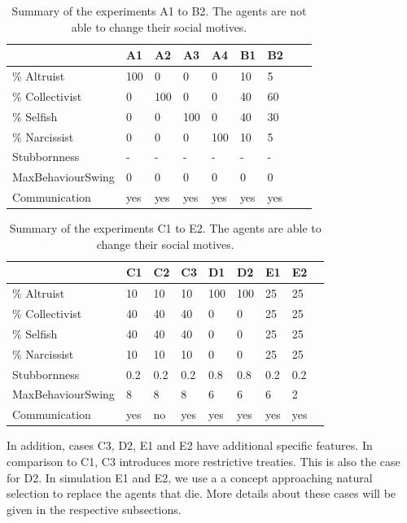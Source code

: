 \begin{table}[h]
\centering
\begin{tabular}{l|llllllll}
                  & A1  & A2 & A3 & A4 & B1  & B2  \\ \hline
\% Altruist       & 100 & 0  & 0  & 0  & 10  & 5    \\
\% Collectivist   & 0   & 100& 0  & 0  & 40  & 60   \\
\% Selfish        & 0   & 0  & 100& 0  & 40  & 30   \\
\% Narcissist     & 0   & 0  & 0  & 100& 10  & 5    \\
Stubbornness      & -   & -  & -  & -  &  -  & -    \\
MaxBehaviourSwing & 0   & 0  & 0  & 0  &  0  & 0    \\
Communication     &yes  & yes&yes &yes & yes & yes
\end{tabular}
\caption{Summary of the experiments A1 to B2. The agents are not able to change their social motives.}
\label{tab:simulation_summary_1}
\end{table}

\begin{table}[h]
\centering
\begin{tabular}{l|llllllll}
                  & C1 & C2 & C3 & D1  & D2 & E1 & E2 \\ \hline
\% Altruist       & 10 & 10 & 10 & 100 & 100& 25  & 25 \\
\% Collectivist   & 40 & 40 & 40 & 0   & 0  & 25  & 25 \\
\% Selfish        & 40 & 40 & 40 & 0   & 0  & 25  & 25 \\
\% Narcissist     & 10 & 10 & 10 & 0   & 0  & 25  & 25 \\
Stubbornness      & 0.2& 0.2& 0.2& 0.8 & 0.8& 0.2 & 0.2\\
MaxBehaviourSwing & 8  & 8  & 8  & 6   & 6  & 6   & 2 \\
Communication     & yes&no  &yes & yes &yes & yes & yes
\end{tabular}
\caption{Summary of the experiments C1 to E2. The agents are able to change their social motives.}
\label{tab:simulation_summary_2}
\end{table}

In addition, cases C3, D2, E1 and E2 have additional specific features. In comparison to C1, C3 introduces more restrictive treaties. This is also the case for D2. In simulation E1 and E2, we use a a concept approaching natural selection to replace the agents that die. More details about these cases will be given in the respective subsections.

